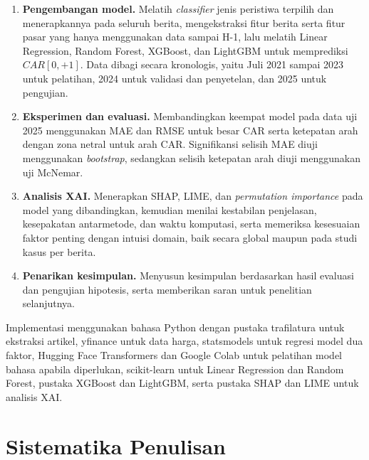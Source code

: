 \begin{enumerate}
    \item \textbf{Pengembangan model.} Melatih \emph{classifier} jenis peristiwa terpilih dan menerapkannya pada seluruh berita, mengekstraksi fitur berita serta fitur pasar yang hanya menggunakan data sampai H-1, lalu melatih Linear Regression, Random Forest, XGBoost, dan LightGBM untuk memprediksi $CAR[0,+1]$. Data dibagi secara kronologis, yaitu Juli 2021 sampai 2023 untuk pelatihan, 2024 untuk validasi dan penyetelan, dan 2025 untuk pengujian.
    \item \textbf{Eksperimen dan evaluasi.} Membandingkan keempat model pada data uji 2025 menggunakan MAE dan RMSE untuk besar CAR serta ketepatan arah dengan zona netral untuk arah CAR. Signifikansi selisih MAE diuji menggunakan \emph{bootstrap}, sedangkan selisih ketepatan arah diuji menggunakan uji McNemar.
    \item \textbf{Analisis XAI.} Menerapkan SHAP, LIME, dan \emph{permutation importance} pada model yang dibandingkan, kemudian menilai kestabilan penjelasan, kesepakatan antarmetode, dan waktu komputasi, serta memeriksa kesesuaian faktor penting dengan intuisi domain, baik secara global maupun pada studi kasus per berita.
    \item \textbf{Penarikan kesimpulan.} Menyusun kesimpulan berdasarkan hasil evaluasi dan pengujian hipotesis, serta memberikan saran untuk penelitian selanjutnya.
\end{enumerate}

Implementasi menggunakan bahasa Python dengan pustaka trafilatura untuk ekstraksi artikel, yfinance untuk data harga, statsmodels untuk regresi model dua faktor, Hugging Face Transformers dan Google Colab untuk pelatihan model bahasa apabila diperlukan, scikit-learn untuk Linear Regression dan Random Forest, pustaka XGBoost dan LightGBM, serta pustaka SHAP dan LIME untuk analisis XAI.

\section{Sistematika Penulisan}

